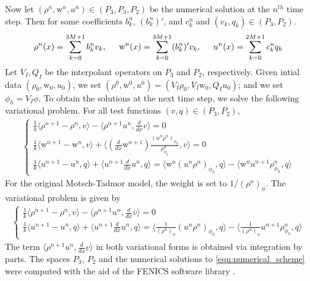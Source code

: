 \documentclass[11pt,letterpaper]{amsart}
\theoremstyle{plain}
\theoremstyle{definition}
\theoremstyle{remark}
\def \lan {\langle}
\def \ran {\rangle}
\def \wt {\mathrm{w}}
\begin{document}
    Now let $(\rho^n, \wt^n, u^n) \in (P_3, P_3, P_2)$ be the numerical solution at the $n^{th}$ time step. 
    Then for some coefficients $b_k^n$, $(b^n_k)'$, and $c_k^n$ and $(v_k, q_k) \in (P_3, P_2)$. 
    \begin{align*}
        \rho^n(x) = \sum_{k=0}^{3M + 1} b_k^n v_k, \hspace{5mm}
        \wt^n(x) = \sum_{k=0}^{3M + 1} (b^n_k)' v_k, \hspace{5mm}
        u^n(x) = \sum_{k=0}^{2M + 1} c_k^n q_k  
    \end{align*}
    Let $V_I, Q_I$ be the interpolant operators on $P_3$ and $P_2$, respectively. 
    Given intial data $(\rho_0, \wt_0, u_0)$, we set $(\rho^0, \wt^0, u^0) = (V_I \rho_0, V_I \wt_0, Q_I u_0)$; 
    and we set $\phi_h = V_I \phi$. 
    To obtain the solutions at the next time step, we solve the following variational problem. 
    For all test functions $(v, q) \in (P_3, P_2)$, 
    \begin{align}
        \label{eqn:numerical_scheme}
        \begin{cases}
            \frac{1}{k}  \lan \rho^{n+1} - \rho^n, v \ran  -  \lan \rho^{n+1} u^n, \frac{d}{dx} v \ran  =  0 \\ 
            \frac{1}{k}  \lan \wt^{n+1} - \wt^n, v \ran    +   \lan (\frac{d}{dx} \wt^{n+1}) \frac{(u^n \rho^n)_{\phi_h}}{\rho^n_{\phi_h}}, v  \ran  = 0 \\ 
            \frac{1}{k}  \lan u^{n+1} - u^n, q \ran  +  \lan u^{n+1} \frac{d}{dx} u^n, q \ran   =    \lan \wt^n (u^n \rho^n)_{\phi_h}, q \ran -  \lan \wt^n u^{n+1} \rho^n_{\phi_h}, q \ran
        \end{cases}
    \end{align}
    For the original Motsch-Tadmor model, the weight is set to $1/(\rho^n)_{\phi}$.  The variational problem is given by 
    \begin{align}
        \label{eqn:numerical_scheme_MT}
        \begin{cases}
            \frac{1}{k}  \lan \rho^{n+1} - \rho^n, v \ran  -  \lan \rho^{n+1} u^n, \frac{d}{dx} v \ran  =  0 \\ 
            \frac{1}{k}  \lan u^{n+1} - u^n, q \ran  +  \lan u^{n+1} \frac{d}{dx} u^n, q \ran   =    \lan \frac{1}{(\rho^n)_{\phi}} (u^n \rho^n)_{\phi_h}, q \ran -  \lan \frac{1}{(\rho^n)_{\phi}} u^{n+1} \rho^n_{\phi_h}, q \ran
        \end{cases}
    \end{align}
    The term $\lan \rho^{n+1} u^n, \frac{d}{dx} v \ran$ in both variational forms is obtained via integration by parts. 
    The spaces $P_3$, $P_2$ and the numerical solutions to \eqref{eqn:numerical_scheme} were computed with 
    the aid of the FENICS software library \cite{LoggWells2010} \cite{LoggEtal_10_2012}. 
\end{document}
